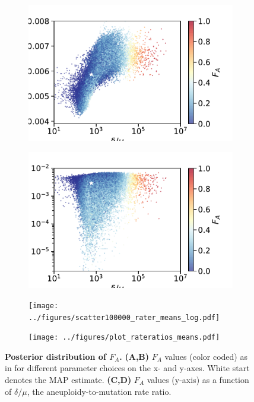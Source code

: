 \documentclass[12pt]{extarticle}
\begin{document}
\begin{figure}[p]
	\begin{subfigure}{0.5\textwidth}
      \centering
      \includegraphics[width=\textwidth]{../figures/scatter100000_rater_fitr_from_wt.pdf}      
	\end{subfigure}
	  \begin{subfigure}{0.5\textwidth}
      \centering
      \includegraphics[width=\textwidth]{../figures/scatter100000_rater_fitr_mut.pdf}
  \end{subfigure}
    \begin{subfigure}{0.5\textwidth}
      \centering
      \texttt{[image: ../figures/scatter100000\_rater\_means\_log.pdf]}
    \end{subfigure}    
  \begin{subfigure}{0.5\textwidth}
      \centering
      \texttt{[image: ../figures/plot\_rateratios\_means.pdf]}
  \end{subfigure}
	\caption{\textbf{Posterior distribution of $F_A$.}
	\textbf{(A,B)} $F_A$ values (color coded) as in  for different parameter choices on the x- and y-axes. White start denotes the MAP estimate.
	\textbf{(C,D)} $F_A$ values (y-axis) as a function of $\delta/\mu$, the aneuploidy-to-mutation rate ratio.
	}
    \label{fig:posterior_FA_supp}
\end{figure}
\end{document}
